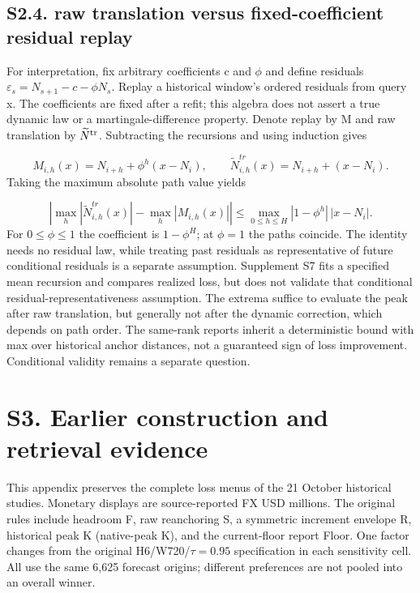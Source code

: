 \documentclass[11pt,a4paper]{article}
\begin{document}
\subsection*{S2.4. raw translation versus fixed-coefficient residual replay}
For interpretation, fix arbitrary coefficients c and \(\phi\) and define residuals \(\varepsilon_s=N_{s+1}-c-\phi N_s\). Replay a historical window's ordered residuals from query x. The coefficients are fixed after a refit; this algebra does not assert a true dynamic law or a martingale-difference property. Denote replay by M and raw translation by \(\widetilde N^{\rm tr}\). Subtracting the recursions and using induction gives

\[
M_{i,h}(x)=N_{i+h}+\phi^h(x-N_i),\qquad \widetilde N^{tr}_{i,h}(x)=N_{i+h}+(x-N_i).
\]
Taking the maximum absolute path value yields

\[
\left|\max_h|\widetilde N^{tr}_{i,h}(x)|-\max_h|M_{i,h}(x)|\right|\le\max_{0\le h\le H}|1-\phi^h|\,|x-N_i|.
\]
For \(0\le\phi\le1\) the coefficient is \(1-\phi^H\); at \(\phi=1\) the paths coincide. The identity needs no residual law, while treating past residuals as representative of future conditional residuals is a separate assumption. Supplement S7 fits a specified mean recursion and compares realized loss, but does not validate that conditional residual-representativeness assumption. The extrema suffice to evaluate the peak after raw translation, but generally not after the dynamic correction, which depends on path order. The same-rank reports inherit a deterministic bound with max over historical anchor distances, not a guaranteed sign of loss improvement. Conditional validity remains a separate question.

\section*{S3. Earlier construction and retrieval evidence}
This appendix preserves the complete loss menus of the 21 October historical studies. Monetary displays are source-reported FX USD millions. The original rules include headroom F, raw reanchoring S, a symmetric increment envelope R, historical peak K (native-peak K), and the current-floor report Floor. One factor changes from the original H6/W720/\(\tau=0.95\) specification in each sensitivity cell. All use the same 6,625 forecast origins; different preferences are not pooled into an overall winner.
\end{document}
